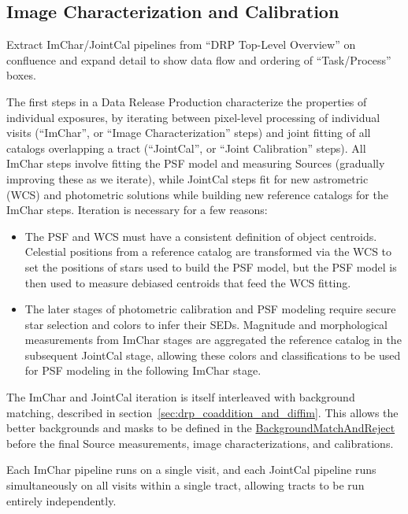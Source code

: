 \subsection{Image Characterization and Calibration}
\label{sec:drp_imchar_and_jointcal}

\begin{note}
Extract ImChar/JointCal pipelines from ``DRP Top-Level Overview'' on confluence and expand detail to show data flow and ordering of ``Task/Process'' boxes.
\end{note}

The first steps in a Data Release Production characterize the properties of individual exposures, by iterating between pixel-level processing of individual visits (``ImChar'', or ``Image Characterization'' steps) and joint fitting of all catalogs overlapping a tract (``JointCal'', or ``Joint Calibration'' steps).  All ImChar steps involve fitting the PSF model and measuring Sources (gradually improving these as we iterate), while JointCal steps fit for new astrometric (WCS) and photometric solutions while building new reference catalogs for the ImChar steps.  Iteration is necessary for a few reasons:
\begin{itemize}
\item The PSF and WCS must have a consistent definition of object centroids.  Celestial positions from a reference catalog are transformed via the WCS to set the positions of stars used to build the PSF model, but the PSF model is then used to measure debiased centroids that feed the WCS fitting.
\item The later stages of photometric calibration and PSF modeling require secure star selection and colors to infer their SEDs.  Magnitude and morphological measurements from ImChar stages are aggregated the reference catalog in the subsequent JointCal stage, allowing these colors and classifications to be used for PSF modeling in the following ImChar stage.
\end{itemize}

The ImChar and JointCal iteration is itself interleaved with background matching, described in section~\ref{sec:drp_coaddition_and_diffim}.  This allows the better backgrounds and masks to be defined in the \hyperref[sec:drpBackgroundMatchAndReject]{BackgroundMatchAndReject} before the final Source measurements, image characterizations, and calibrations.

Each ImChar pipeline runs on a single visit, and each JointCal pipeline runs simultaneously on all visits within a single tract, allowing tracts to be run entirely independently.

